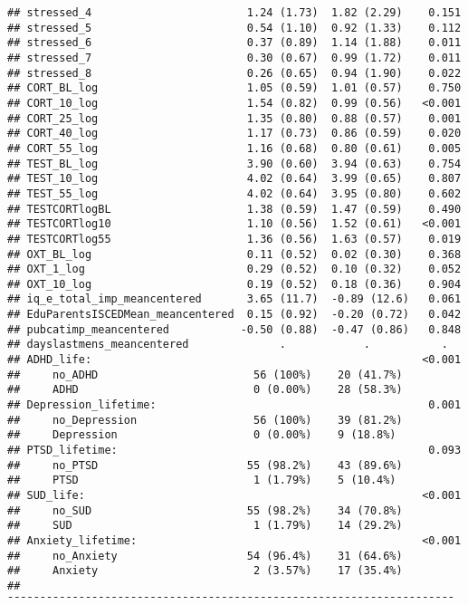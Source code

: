 \documentclass[
]{article}
\begin{document}
\begin{verbatim}
## stressed_4                        1.24 (1.73)  1.82 (2.29)    0.151   
## stressed_5                        0.54 (1.10)  0.92 (1.33)    0.112   
## stressed_6                        0.37 (0.89)  1.14 (1.88)    0.011   
## stressed_7                        0.30 (0.67)  0.99 (1.72)    0.011   
## stressed_8                        0.26 (0.65)  0.94 (1.90)    0.022   
## CORT_BL_log                       1.05 (0.59)  1.01 (0.57)    0.750   
## CORT_10_log                       1.54 (0.82)  0.99 (0.56)   <0.001   
## CORT_25_log                       1.35 (0.80)  0.88 (0.57)    0.001   
## CORT_40_log                       1.17 (0.73)  0.86 (0.59)    0.020   
## CORT_55_log                       1.16 (0.68)  0.80 (0.61)    0.005   
## TEST_BL_log                       3.90 (0.60)  3.94 (0.63)    0.754   
## TEST_10_log                       4.02 (0.64)  3.99 (0.65)    0.807   
## TEST_55_log                       4.02 (0.64)  3.95 (0.80)    0.602   
## TESTCORTlogBL                     1.38 (0.59)  1.47 (0.59)    0.490   
## TESTCORTlog10                     1.10 (0.56)  1.52 (0.61)   <0.001   
## TESTCORTlog55                     1.36 (0.56)  1.63 (0.57)    0.019   
## OXT_BL_log                        0.11 (0.52)  0.02 (0.30)    0.368   
## OXT_1_log                         0.29 (0.52)  0.10 (0.32)    0.052   
## OXT_10_log                        0.19 (0.52)  0.18 (0.36)    0.904   
## iq_e_total_imp_meancentered       3.65 (11.7)  -0.89 (12.6)   0.061   
## EduParentsISCEDMean_meancentered  0.15 (0.92)  -0.20 (0.72)   0.042   
## pubcatimp_meancentered           -0.50 (0.88)  -0.47 (0.86)   0.848   
## dayslastmens_meancentered              .            .           .     
## ADHD_life:                                                   <0.001   
##     no_ADHD                        56 (100%)    20 (41.7%)            
##     ADHD                           0 (0.00%)    28 (58.3%)            
## Depression_lifetime:                                          0.001   
##     no_Depression                  56 (100%)    39 (81.2%)            
##     Depression                     0 (0.00%)    9 (18.8%)             
## PTSD_lifetime:                                                0.093   
##     no_PTSD                       55 (98.2%)    43 (89.6%)            
##     PTSD                           1 (1.79%)    5 (10.4%)             
## SUD_life:                                                    <0.001   
##     no_SUD                        55 (98.2%)    34 (70.8%)            
##     SUD                            1 (1.79%)    14 (29.2%)            
## Anxiety_lifetime:                                            <0.001   
##     no_Anxiety                    54 (96.4%)    31 (64.6%)            
##     Anxiety                        2 (3.57%)    17 (35.4%)            
## ¯¯¯¯¯¯¯¯¯¯¯¯¯¯¯¯¯¯¯¯¯¯¯¯¯¯¯¯¯¯¯¯¯¯¯¯¯¯¯¯¯¯¯¯¯¯¯¯¯¯¯¯¯¯¯¯¯¯¯¯¯¯¯¯¯¯¯¯¯
\end{verbatim}
\end{document}

